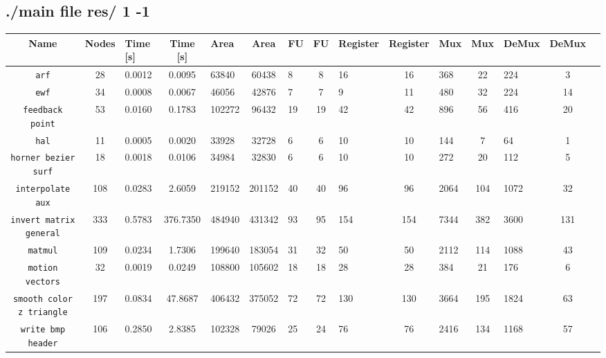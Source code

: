\documentclass[a4paper, 11pt, oneside]{article}
\begin{document}
\begin{landscape}
\clearpage
\subsection{./main file res/ 1 -1}
\begin{table}[!h]
  \begin{center}
  \begin{tabular}{|c|c V{3} c|g|c|g|c|g|c|g|c|g|c|g|}
    \hline
    \textbf{Name} & \textbf{Nodes} & \textbf{Time [s]} & \textbf{Time [s]} & \textbf{Area} & \textbf{Area} & \textbf{FU} & \textbf{FU} & \textbf{Register} & \textbf{Register} & \textbf{Mux} & \textbf{Mux}
    & \textbf{DeMux} & \textbf{DeMux}\\
    \hline
    \texttt{arf}										  &  28 & 0.0012 &   0.0095 &  63840 &  60438 &  8 &  8 &  16 &  16 &  368 &  22 &  224 & 3 \\ \hline
    \texttt{ewf}										  &  34 & 0.0008 &   0.0067 &  46056 &  42876 &  7 &  7 &   9 &  11 &  480 &  32 &  224 & 14 \\ \hline
    \texttt{feedback point}					  &  53 & 0.0160 &   0.1783 & 102272 &  96432 & 19 & 19 &  42 &  42 &  896 &  56 &  416 & 20 \\ \hline
    \texttt{hal}										  &  11 & 0.0005 &   0.0020 &  33928 &  32728 &  6 &  6 &  10 &  10 &  144 &   7 &   64 & 1 \\ \hline
    \texttt{horner bezier surf}			  &  18 & 0.0018 &   0.0106 &  34984 &  32830 &  6 &  6 &  10 &  10 &  272 &  20 &  112 & 5 \\ \hline
    \texttt{interpolate aux}				  & 108 & 0.0283 &   2.6059 & 219152 & 201152 & 40 & 40 &  96 &  96 & 2064 & 104 & 1072 & 32 \\ \hline
    \texttt{invert matrix general}	  & 333 & 0.5783 & 376.7350 & 484940 & 431342 & 93 & 95 & 154 & 154 & 7344 & 382 & 3600 & 131 \\ \hline
    \texttt{matmul}									  & 109 & 0.0234 &   1.7306 & 199640 & 183054 & 31 & 32 &  50 &  50 & 2112 & 114 & 1088 & 43 \\ \hline
    \texttt{motion vectors}					  &  32 & 0.0019 &   0.0249 & 108800 & 105602 & 18 & 18 &  28 &  28 &  384 &  21 &  176 & 6 \\ \hline
    \texttt{smooth color z triangle}	& 197 & 0.0834 &  47.8687 & 406432 & 375052 & 72 & 72 & 130 & 130 & 3664 & 195 & 1824 & 63 \\ \hline
    \texttt{write bmp header}				  & 106 & 0.2850 &   2.8385 & 102328 &  79026 & 25 & 24 &  76 &  76 & 2416 & 134 & 1168 & 57 \\ \hline
  \end{tabular}
  \end{center}
\end{table}


\end{landscape}
\end{document}
